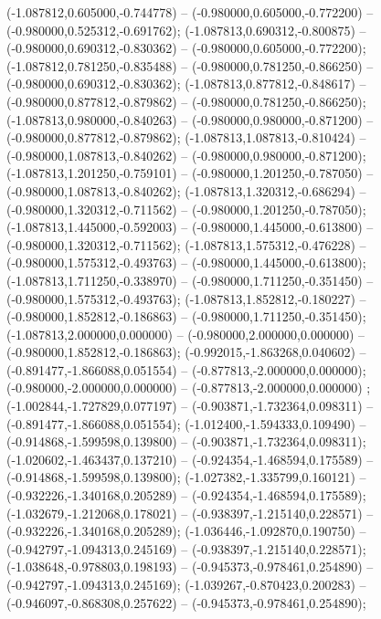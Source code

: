  (-1.087812,0.605000,-0.744778) -- (-0.980000,0.605000,-0.772200) -- (-0.980000,0.525312,-0.691762);
 (-1.087813,0.690312,-0.800875) -- (-0.980000,0.690312,-0.830362) -- (-0.980000,0.605000,-0.772200);
 (-1.087812,0.781250,-0.835488) -- (-0.980000,0.781250,-0.866250) -- (-0.980000,0.690312,-0.830362);
 (-1.087813,0.877812,-0.848617) -- (-0.980000,0.877812,-0.879862) -- (-0.980000,0.781250,-0.866250);
 (-1.087813,0.980000,-0.840263) -- (-0.980000,0.980000,-0.871200) -- (-0.980000,0.877812,-0.879862);
 (-1.087813,1.087813,-0.810424) -- (-0.980000,1.087813,-0.840262) -- (-0.980000,0.980000,-0.871200);
 (-1.087813,1.201250,-0.759101) -- (-0.980000,1.201250,-0.787050) -- (-0.980000,1.087813,-0.840262);
 (-1.087813,1.320312,-0.686294) -- (-0.980000,1.320312,-0.711562) -- (-0.980000,1.201250,-0.787050);
 (-1.087813,1.445000,-0.592003) -- (-0.980000,1.445000,-0.613800) -- (-0.980000,1.320312,-0.711562);
 (-1.087813,1.575312,-0.476228) -- (-0.980000,1.575312,-0.493763) -- (-0.980000,1.445000,-0.613800);
 (-1.087813,1.711250,-0.338970) -- (-0.980000,1.711250,-0.351450) -- (-0.980000,1.575312,-0.493763);
 (-1.087813,1.852812,-0.180227) -- (-0.980000,1.852812,-0.186863) -- (-0.980000,1.711250,-0.351450);
 (-1.087813,2.000000,0.000000) -- (-0.980000,2.000000,0.000000) -- (-0.980000,1.852812,-0.186863);
 (-0.992015,-1.863268,0.040602) -- (-0.891477,-1.866088,0.051554) -- (-0.877813,-2.000000,0.000000);
 (-0.980000,-2.000000,0.000000) -- (-0.877813,-2.000000,0.000000) ;
 (-1.002844,-1.727829,0.077197) -- (-0.903871,-1.732364,0.098311) -- (-0.891477,-1.866088,0.051554);
 (-1.012400,-1.594333,0.109490) -- (-0.914868,-1.599598,0.139800) -- (-0.903871,-1.732364,0.098311);
 (-1.020602,-1.463437,0.137210) -- (-0.924354,-1.468594,0.175589) -- (-0.914868,-1.599598,0.139800);
 (-1.027382,-1.335799,0.160121) -- (-0.932226,-1.340168,0.205289) -- (-0.924354,-1.468594,0.175589);
 (-1.032679,-1.212068,0.178021) -- (-0.938397,-1.215140,0.228571) -- (-0.932226,-1.340168,0.205289);
 (-1.036446,-1.092870,0.190750) -- (-0.942797,-1.094313,0.245169) -- (-0.938397,-1.215140,0.228571);
 (-1.038648,-0.978803,0.198193) -- (-0.945373,-0.978461,0.254890) -- (-0.942797,-1.094313,0.245169);
 (-1.039267,-0.870423,0.200283) -- (-0.946097,-0.868308,0.257622) -- (-0.945373,-0.978461,0.254890);
